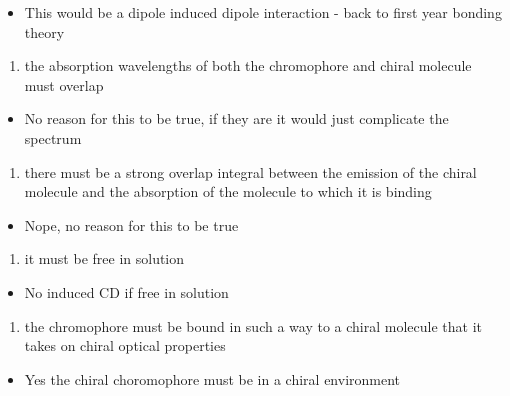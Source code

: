 \documentclass[
]{book}
\providecommand{\tightlist}{%
  \setlength{\itemsep}{0pt}\setlength{\parskip}{0pt}}
\begin{document}
\begin{itemize}
\tightlist
\item
  This would be a dipole induced dipole interaction - back to first year bonding theory
\end{itemize}

\begin{enumerate}
\def\labelenumi{\alph{enumi}.}
\setcounter{enumi}{3}
\tightlist
\item
  the absorption wavelengths of both the chromophore and chiral molecule must overlap
\end{enumerate}

\begin{itemize}
\tightlist
\item
  No reason for this to be true, if they are it would just complicate the spectrum
\end{itemize}

\begin{enumerate}
\def\labelenumi{\alph{enumi}.}
\setcounter{enumi}{4}
\tightlist
\item
  there must be a strong overlap integral between the emission of the chiral molecule and the absorption of the molecule to which it is binding
\end{enumerate}

\begin{itemize}
\tightlist
\item
  Nope, no reason for this to be true
\end{itemize}

\begin{enumerate}
\def\labelenumi{\alph{enumi}.}
\setcounter{enumi}{5}
\tightlist
\item
  it must be free in solution
\end{enumerate}

\begin{itemize}
\tightlist
\item
  No induced CD if free in solution
\end{itemize}

\begin{enumerate}
\def\labelenumi{\alph{enumi}.}
\setcounter{enumi}{6}
\tightlist
\item
  the chromophore must be bound in such a way to a chiral molecule that it takes on chiral optical properties
\end{enumerate}

\begin{itemize}
\tightlist
\item
  Yes the chiral choromophore must be in a chiral environment
\end{itemize}
\end{document}
